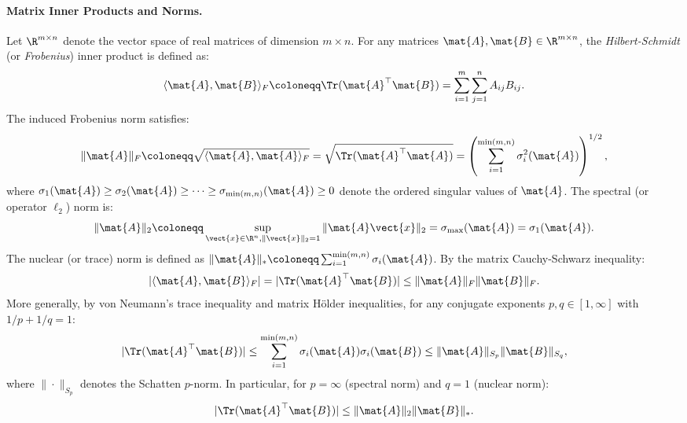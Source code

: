 \paragraph{Matrix Inner Products and Norms.}
Let $\R^{m \times n}$ denote the vector space of real matrices of dimension $m \times n$. For any matrices $\mat{A}, \mat{B} \in \R^{m \times n}$, the \emph{Hilbert-Schmidt} (or \emph{Frobenius}) inner product is defined as:
\begin{equation}
\langle \mat{A}, \mat{B} \rangle_F \coloneqq \Tr(\mat{A}^\top \mat{B}) = \sum_{i=1}^m \sum_{j=1}^n A_{ij} B_{ij}.
\label{eq:frobenius_inner_product}
\end{equation}
The induced Frobenius norm satisfies:
\begin{equation}
\|\mat{A}\|_F \coloneqq \sqrt{\langle \mat{A}, \mat{A} \rangle_F} = \sqrt{\Tr(\mat{A}^\top \mat{A})} = \left( \sum_{i=1}^{\min(m, n)} \sigma_i^2(\mat{A}) \right)^{1/2},
\label{eq:frobenius_norm_def}
\end{equation}
where $\sigma_1(\mat{A}) \ge \sigma_2(\mat{A}) \ge \dots \ge \sigma_{\min(m, n)}(\mat{A}) \ge 0$ denote the ordered singular values of $\mat{A}$. The spectral (or operator $\ell_2$) norm is:
\begin{equation}
\|\mat{A}\|_2 \coloneqq \sup_{\vect{x} \in \R^n, \|\vect{x}\|_2 = 1} \|\mat{A} \vect{x}\|_2 = \sigma_{\max}(\mat{A}) = \sigma_1(\mat{A}).
\label{eq:spectral_norm_def}
\end{equation}
The nuclear (or trace) norm is defined as $\|\mat{A}\|_* \coloneqq \sum_{i=1}^{\min(m, n)} \sigma_i(\mat{A})$. By the matrix Cauchy-Schwarz inequality:
\begin{equation}
|\langle \mat{A}, \mat{B} \rangle_F| = |\Tr(\mat{A}^\top \mat{B})| \le \|\mat{A}\|_F \|\mat{B}\|_F.
\label{eq:matrix_cauchy_schwarz}
\end{equation}
More generally, by von Neumann's trace inequality and matrix H\"older inequalities, for any conjugate exponents $p, q \in [1, \infty]$ with $1/p + 1/q = 1$:
\begin{equation}
|\Tr(\mat{A}^\top \mat{B})| \le \sum_{i=1}^{\min(m, n)} \sigma_i(\mat{A}) \sigma_i(\mat{B}) \le \|\mat{A}\|_{S_p} \|\mat{B}\|_{S_q},
\label{eq:matrix_holder_inequality}
\end{equation}
where $\|\cdot\|_{S_p}$ denotes the Schatten $p$-norm. In particular, for $p=\infty$ (spectral norm) and $q=1$ (nuclear norm):
\begin{equation}
|\Tr(\mat{A}^\top \mat{B})| \le \|\mat{A}\|_2 \|\mat{B}\|_*.
\end{equation}

